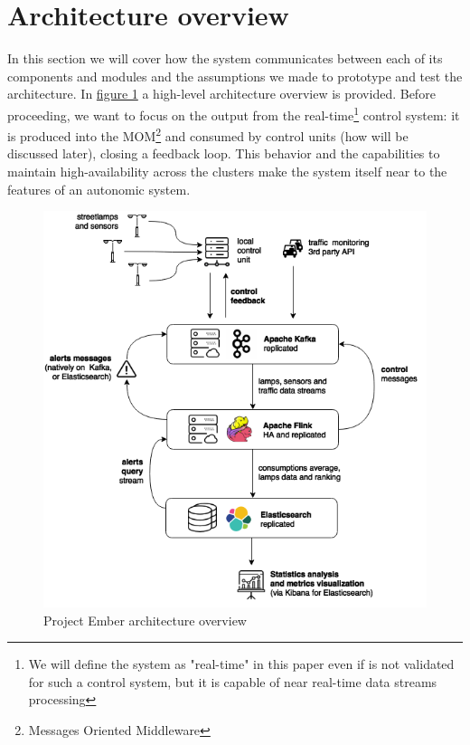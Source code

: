 \section{Architecture overview}
In this section we will cover how the system communicates between each of its components and modules and the assumptions we made to prototype and test the architecture. In \hyperref[fig:ember_architecture]{figure 1} a high-level architecture overview is provided. Before proceeding, we want to focus on the output from the real-time\footnote{We will define the system as "real-time" in this paper even if is not validated for such a control system, but it is capable of near real-time data streams processing} control system: it is produced into the MOM\footnote{Messages Oriented Middleware} and consumed by control units (how will be discussed later), closing a feedback loop. This behavior and the capabilities to maintain high-availability across the clusters make the system itself near to the features of an autonomic system.
\begin{figure}
\begin{center}
	\includegraphics[scale=0.35]{img/ember_architecture}
	\caption{Project Ember architecture overview}
	\label{fig:ember_architecture}
\end{center}
	
\end{figure}


